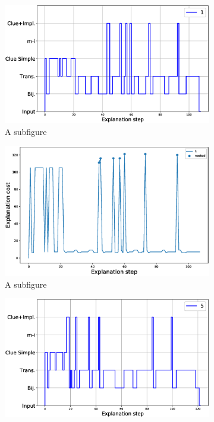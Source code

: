 \begin{figure}
\centering
\begin{subfigure}{.5\textwidth}
\centering
\includegraphics[width=0.98\linewidth]{figures/plot_cost_steps_1.eps}
\caption{A subfigure}
\label{fig:sub1}
\end{subfigure}%
\begin{subfigure}{.5\textwidth}
\centering
\includegraphics[width=0.9\linewidth]{figures/1.eps}
\caption{A subfigure}
\label{fig:sub2}
\end{subfigure}
\begin{subfigure}{.5\textwidth}
	\centering
	\includegraphics[width=0.98\linewidth]{figures/plot_cost_steps_5.eps}

\end{subfigure}
\end{figure}
